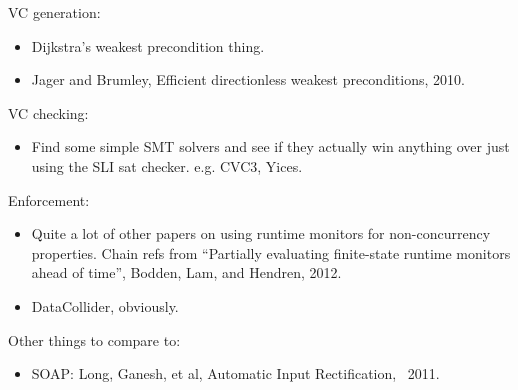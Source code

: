 VC generation:

\begin{itemize}
\item
  Dijkstra's weakest precondition thing.
\item
  Jager and Brumley, Efficient directionless weakest preconditions, 2010.
\end{itemize}

VC checking:

\begin{itemize}
\item
  Find some simple SMT solvers and see if they actually win anything over just using the SLI sat checker.
  e.g. CVC3, Yices.
\end{itemize}

Enforcement:

\begin{itemize}
\item
  Quite a lot of other papers on using runtime monitors for non-concurrency properties.
  Chain refs from ``Partially evaluating finite-state runtime monitors ahead of time'', Bodden, Lam, and Hendren, 2012.
\item
  DataCollider, obviously.
\end{itemize}

Other things to compare to:

\begin{itemize}
\item
  SOAP: Long, Ganesh, et al, Automatic Input Rectification, ~2011.
\end{itemize}

